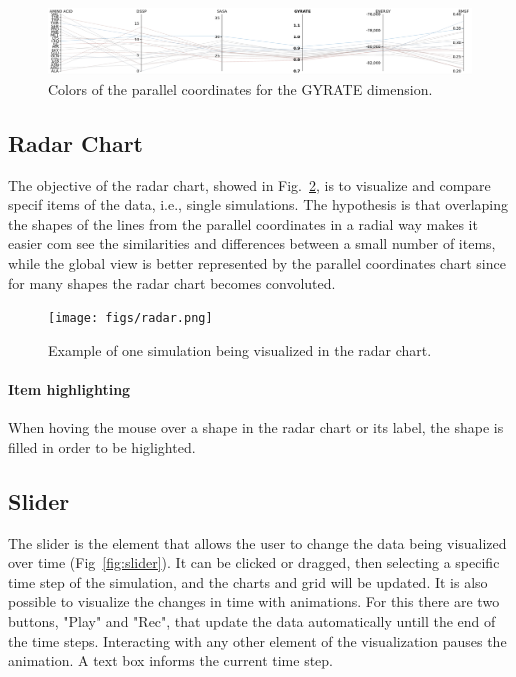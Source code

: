 \documentclass[10pt, conference]{IEEEtran}
\begin{document}
\begin{figure}
\includegraphics[width=1.0\linewidth]{figs/gyrate.png}
\caption{Colors of the parallel coordinates for the GYRATE dimension.} 
\label{fig:gyrate}
\end{figure}

\subsection{Radar Chart}

The objective of the radar chart, showed in Fig.~\ref{fig:radar}, is to visualize and compare specif items of the data, i.e., single simulations. The hypothesis is that overlaping the shapes of the lines from the parallel coordinates in a radial way makes it easier com see the similarities and differences between a small number of items, while the global view is better represented by the parallel coordinates chart since for many shapes the radar chart becomes convoluted.  

\begin{figure}
\texttt{[image: figs/radar.png]}
\caption{Example of one simulation being visualized in the radar chart.} 
\label{fig:radar}
\end{figure}
\paragraph*{Item highlighting} When hoving the mouse over a shape in the radar chart or its label, the shape is filled in order to be higlighted.

\subsection{Slider}

The slider is the element that allows the user to change the data being visualized over time (Fig~\ref{fig:slider}). It can be clicked or dragged, then selecting a specific time step of the simulation, and the charts and grid will be updated. It is also possible to visualize the changes in time with animations. For this there are two buttons, "Play" and "Rec", that update the data automatically untill the end of the time steps. Interacting with any other element of the visualization pauses the animation. A text box informs the current time step.
\end{document}
